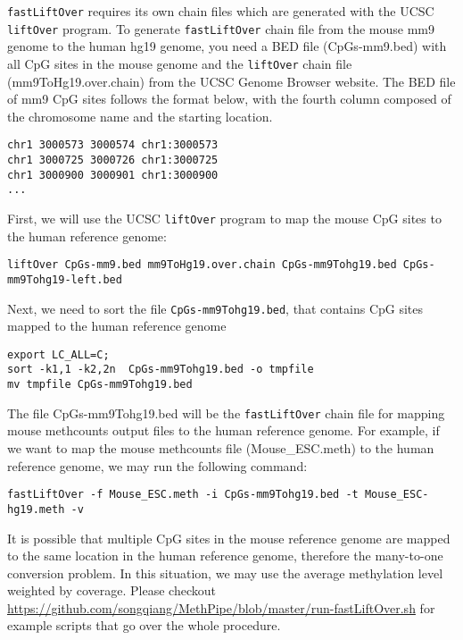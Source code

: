 \documentclass[10pt]{article}
\newcommand{\prog}[1]{\texttt{#1}}
\begin{document}
\prog{fastLiftOver} requires its own chain files which are generated
with the UCSC \prog{liftOver} program. To generate \prog{fastLiftOver}
chain file from the mouse mm9 genome to the human hg19 genome, you
need a BED file (CpGs-mm9.bed) with all CpG sites in the mouse genome
and the \prog{liftOver} chain file (mm9ToHg19.over.chain) from the
UCSC Genome Browser website. The BED file of mm9 CpG sites follows the
format below, with the fourth column composed of the chromosome name
and the starting location.
\begin{verbatim}
chr1 3000573 3000574 chr1:3000573
chr1 3000725 3000726 chr1:3000725
chr1 3000900 3000901 chr1:3000900
...
\end{verbatim}
First, we will use the UCSC \prog{liftOver} program to map the mouse
CpG sites to the human reference genome:
\begin{verbatim}
liftOver CpGs-mm9.bed mm9ToHg19.over.chain CpGs-mm9Tohg19.bed CpGs-mm9Tohg19-left.bed 
\end{verbatim}
Next, we need to sort the file \prog{CpGs-mm9Tohg19.bed}, that
contains CpG sites mapped to the human reference genome
\begin{verbatim}
export LC_ALL=C;
sort -k1,1 -k2,2n  CpGs-mm9Tohg19.bed -o tmpfile 
mv tmpfile CpGs-mm9Tohg19.bed
\end{verbatim}
The file CpGs-mm9Tohg19.bed will be the \prog{fastLiftOver} chain file
for mapping mouse methcounts output files to the human reference
genome. For example, if we want to map the mouse methcounts file
(Mouse\_ESC.meth) to the human reference genome, we may run the
following command:
\begin{verbatim}
fastLiftOver -f Mouse_ESC.meth -i CpGs-mm9Tohg19.bed -t Mouse_ESC-hg19.meth -v
\end{verbatim}

It is possible that multiple CpG sites in the mouse reference genome
are mapped to the same location in the human reference genome,
therefore the many-to-one conversion problem. In this situation, we
may use the average methylation level weighted by coverage. Please
checkout
\url{https://github.com/songqiang/MethPipe/blob/master/run-fastLiftOver.sh}
for example scripts that go over the whole procedure.


\newpage



\end{document}
